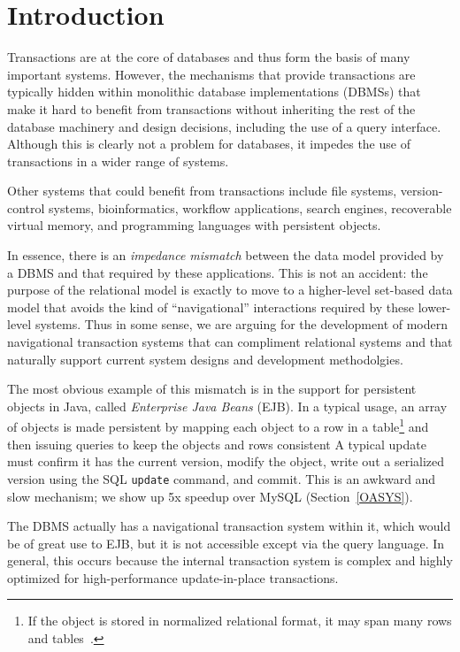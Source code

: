 \documentclass[10pt,letterpaper,twocolumn,english]{article}
\begin{document}
\section{Introduction}

Transactions are at the core of databases and thus form the basis of many
important systems. However, the mechanisms that provide transactions are
typically hidden within monolithic database implementations (DBMSs) that make
it hard to benefit from transactions without inheriting the rest of
the database machinery and design decisions, including the use of a
query interface.  Although this is clearly not a problem for
databases, it impedes the use of transactions in a wider range of
systems.

Other systems that could benefit from transactions include file
systems, version-control systems, bioinformatics, workflow
applications, search engines, recoverable virtual memory, and
programming languages with persistent objects.

In essence, there is an {\em impedance mismatch} between the data
model provided by a DBMS and that required by these applications. This is
not an accident: the purpose of the relational model is exactly to
move to a higher-level set-based data model that avoids the kind of
``navigational'' interactions required by these lower-level systems.
Thus in some sense, we are arguing for the development of modern
navigational transaction systems that can compliment relational systems 
and that naturally support current system designs and development methodolgies.

The most obvious example of this mismatch is in the support for
persistent objects in Java, called {\em Enterprise Java Beans}
(EJB). In a typical usage, an array of objects is made persistent by
mapping each object to a row in a table\footnote{If the object is
stored in normalized relational format, it may span many rows and
tables~\cite{Hibernate}.}  and then issuing queries to keep the
objects and rows consistent A typical update must confirm it has the
current version, modify the object, write out a serialized version
using the SQL {\tt update} command, and commit.  This is an awkward
and slow mechanism; we show up 5x speedup over MySQL
(Section~\ref{OASYS}).

The DBMS actually has a navigational transaction system within it,
which would be of great use to EJB, but it is not accessible except
via the query language.  In general, this occurs because the internal
transaction system is complex and highly optimized for
high-performance update-in-place transactions.
\end{document}
